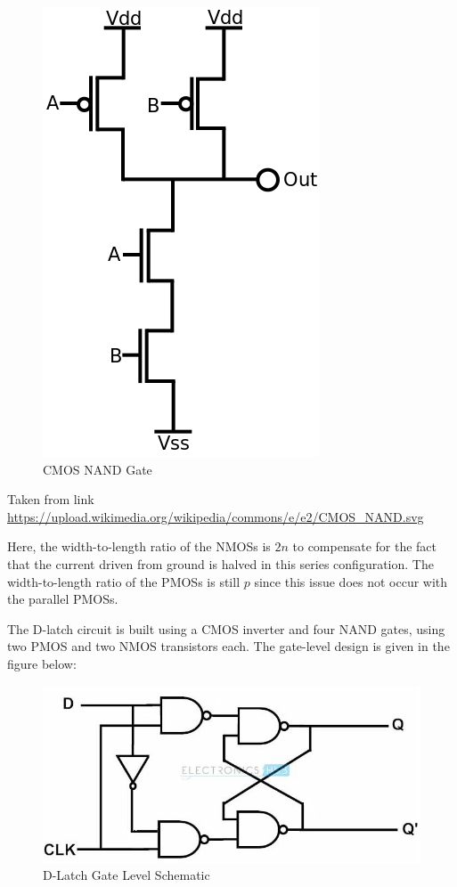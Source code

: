 \begin{figure}[h!]
	\centering
	\includegraphics[scale=0.75]{./images/CMOS_NAND.PNG}
	\caption{CMOS NAND Gate}
	\label{fig:CMOS_NAND}
\end{figure}

\FloatBarrier

{\footnotesize Taken from link \url{https://upload.wikimedia.org/wikipedia/commons/e/e2/CMOS_NAND.svg}}

\FloatBarrier

Here, the width-to-length ratio of the NMOSs is $2n$ to compensate for the fact that the current driven from ground is halved in this series configuration.
The width-to-length ratio of the PMOSs is still $p$ since this issue does not occur with the parallel PMOSs.

The D-latch circuit is built using a CMOS inverter and four NAND gates, using two PMOS and two NMOS transistors each. The gate-level design is given in the figure below:

\FloatBarrier

\begin{figure}[h!]
	\centering
	\includegraphics[scale=0.75]{./images/dlatchgates.PNG}
	\caption{D-Latch Gate Level Schematic}
	\label{fig:dlatchgates}
\end{figure}

